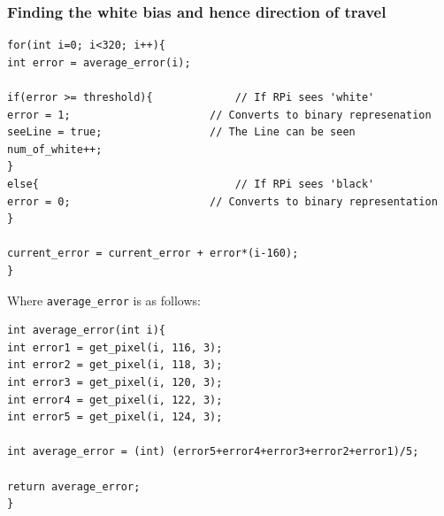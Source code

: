 \documentclass[paper=a4, fontsize=11pt]{scrartcl} %
\numberwithin{equation}{section} %
\numberwithin{figure}{section} %
\begin{document}
\subsubsection{Finding the white bias and hence direction of travel}
\begin{verbatim}
for(int i=0; i<320; i++){
int error = average_error(i);

if(error >= threshold){				// If RPi sees 'white'
error = 1;						// Converts to binary represenation
seeLine = true;					// The Line can be seen
num_of_white++;
}
else{								// If RPi sees 'black'
error = 0;						// Converts to binary representation
}

current_error = current_error + error*(i-160);
}
\end{verbatim}
Where \verb|average_error| is as follows:\\
\begin{verbatim}
int average_error(int i){
int error1 = get_pixel(i, 116, 3);
int error2 = get_pixel(i, 118, 3);
int error3 = get_pixel(i, 120, 3);
int error4 = get_pixel(i, 122, 3);
int error5 = get_pixel(i, 124, 3);

int average_error = (int) (error5+error4+error3+error2+error1)/5;

return average_error;
}
\end{verbatim}
\end{document}
